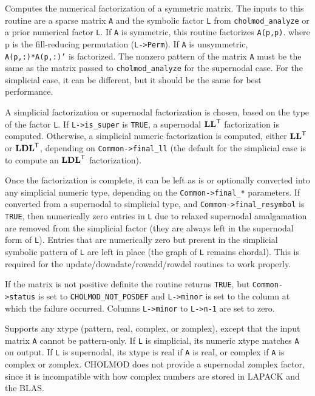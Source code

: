 \documentclass[11pt]{article}
\newcommand{\m}[1]{{\bf{#1}}}       %
\newcommand{\tr}{^{\sf T}}          %
\begin{document}

Computes the numerical factorization of a symmetric matrix.  The %
inputs to this routine are a sparse matrix {\tt A} and the symbolic factor {\tt L} from
{\tt cholmod\_analyze} or a prior numerical factor {\tt L}.  If {\tt A} is symmetric, this
routine factorizes {\tt A(p,p)}. %
where p is the fill-reducing permutation ({\tt L->Perm}).  If {\tt A} is unsymmetric,
{\tt A(p,:)*A(p,:)'} %
is factorized.  %
The nonzero pattern of the matrix {\tt A} must be the same as the matrix passed to
{\tt cholmod\_analyze} for the supernodal case.  For the simplicial case, it can
be different, but it should be the same for best performance. %

A simplicial factorization or supernodal factorization is chosen, based on
the type of the factor {\tt L}.  If {\tt L->is\_super} is {\tt TRUE}, a supernodal $\m{LL}\tr$
factorization is computed.  Otherwise, a simplicial numeric factorization
is computed, either $\m{LL}\tr$ or $\m{LDL}\tr$, depending on {\tt Common->final\_ll}
(the default for the simplicial case is to compute an $\m{LDL}\tr$ factorization).

Once the factorization is complete, it can be left as is or optionally
converted into any simplicial numeric type, depending on the
{\tt Common->final\_*} parameters.  If converted from a supernodal to simplicial
type, and {\tt Common->final\_resymbol} is {\tt TRUE}, then numerically
zero entries in {\tt L} due to relaxed supernodal amalgamation are removed from
the simplicial factor (they are always left in the supernodal form of {\tt L}).
Entries that are numerically zero but present in the simplicial symbolic
pattern of {\tt L} are left in place (the graph of {\tt L} remains chordal).
This is required for the update/downdate/rowadd/rowdel routines to work
properly.

If the matrix is not positive definite the routine returns {\tt TRUE}, but
{\tt Common->status} is set to {\tt CHOLMOD\_NOT\_POSDEF} and {\tt L->minor} is set to the
column at which the failure occurred.  Columns {\tt L->minor} to {\tt L->n-1}
are set to zero.

Supports any xtype (pattern, real, complex, or zomplex), except that the
input matrix {\tt A} cannot be pattern-only.  If {\tt L} is simplicial, its numeric
xtype matches {\tt A} on output.  If {\tt L} is supernodal, its xtype is real if {\tt A} is
real, or complex if {\tt A} is complex or zomplex.  CHOLMOD does not provide
a supernodal zomplex factor, since it is incompatible with how complex numbers are
stored in LAPACK and the BLAS.
\end{document}
